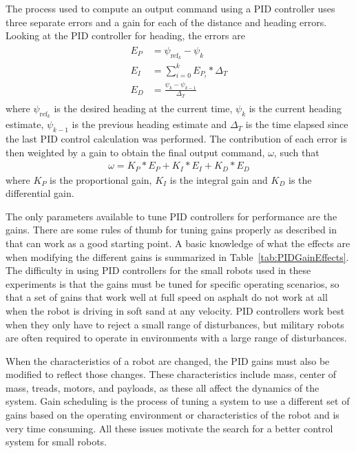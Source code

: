 The process used to compute an output command using a PID controller uses three separate errors and a gain for each of the distance and heading errors.
Looking at the PID controller for heading, the errors are
\begin{align*}
\begin{split}
E_P &= \psi_{\text{ref}_k} - \psi_k \\
E_I &= \sum_{i=0}^{k}E_{P_i}*\Delta_T \\
E_D &= \frac{\psi_k - \psi_{k-1}}{\Delta_T}
\end{split}
\end{align*}
where $\psi_{\text{ref}_k}$ is the desired heading at the current time, $\psi_k$ is the current heading estimate, $\psi_{k-1}$ is the previous heading estimate and $\Delta_T$ is the time elapsed since the last PID control calculation was performed.
The contribution of each error is then weighted by a gain to obtain the final output command, $\omega$, such that
\begin{align*}
\omega = K_P*E_P + K_I*E_I + K_D*E_D
\end{align*}
where $K_P$ is the proportional gain, $K_I$ is the integral gain and $K_D$ is the differential gain.

The only parameters available to tune PID controllers for performance are the gains.
There are some rules of thumb for tuning gains properly as described in~\cite{ZeiglerNichols42} that can work as a good starting point.
A basic knowledge of what the effects are when modifying the different gains is summarized in Table~\ref{tab:PIDGainEffects}.
The difficulty in using PID controllers for the small robots used in these experiments is that the gains must be tuned for specific operating scenarios, so that a set of gains that work well at full speed on asphalt do not work at all when the robot is driving in soft sand at any velocity.
PID controllers work best when they only have to reject a small range of disturbances, but military robots are often required to operate in environments with a large range of disturbances.

When the characteristics of a robot are changed, the PID gains must also be modified to reflect those changes.
These characteristics include mass, center of mass, treads, motors, and payloads, as these all affect the dynamics of the system.
Gain scheduling is the process of tuning a system to use a different set of gains based on the operating environment or characteristics of the robot and is very time consuming.
All these issues motivate the search for a better control system for small robots.

